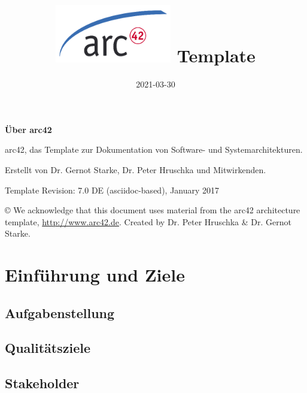 \documentclass[
]{article}
\title{\includegraphics{images/arc42-logo.png} Template}
\author{}
\date{2021-03-30}
\begin{document}
\maketitle

\section{}

\textbf{Über arc42}

arc42, das Template zur Dokumentation von Software- und
Systemarchitekturen.

Erstellt von Dr. Gernot Starke, Dr. Peter Hruschka und Mitwirkenden.

Template Revision: 7.0 DE (asciidoc-based), January 2017

© We acknowledge that this document uses material from the arc42
architecture template, \url{http://www.arc42.de}. Created by Dr. Peter
Hruschka \& Dr. Gernot Starke.

\hypertarget{section-introduction-and-goals}{%
\section{Einführung und Ziele}\label{section-introduction-and-goals}}

\hypertarget{_aufgabenstellung}{%
\subsection{Aufgabenstellung}\label{_aufgabenstellung}}

\hypertarget{_qualit_tsziele}{%
\subsection{Qualitätsziele}\label{_qualit_tsziele}}

\hypertarget{_stakeholder}{%
\subsection{Stakeholder}\label{_stakeholder}}
\end{document}
